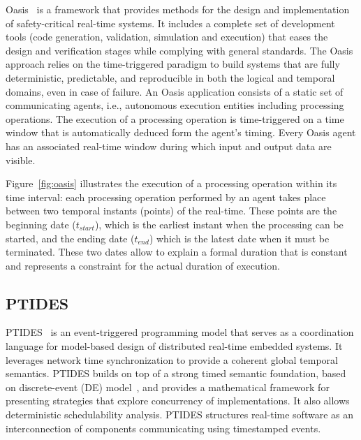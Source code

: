 Oasis~\cite{intro:oasis1,intro:oasis2} is a framework that provides methods for the design 
and implementation of safety-critical real-time systems. It includes a complete set of 
development tools (code generation, validation, simulation and execution) that eases the design 
and verification stages
while complying with general standards. The Oasis approach relies on the time-triggered paradigm
to build systems that are fully deterministic, predictable, and reproducible in both the logical
and temporal domains, even in case of failure.
An Oasis application consists of a static set of communicating agents, i.e., autonomous execution
entities including processing operations. The execution of a processing operation is 
time-triggered on a time window that is automatically deduced form the agent's timing.
Every Oasis agent has an associated real-time window during which input and output data are 
visible.

Figure~\ref{fig:oasis} illustrates the execution of a processing operation within its time
interval: each processing operation performed by an
agent takes place between two temporal instants (points) of the real-time. 
These points are the beginning date ($t_{start}$), which is the earliest instant
when the processing can be started, and the ending date ($t_{end}$) which is the latest
date when it must be terminated. These two dates allow to explain a formal duration 
that is constant and represents a constraint for the actual duration of execution.


\subsection{PTIDES}
PTIDES~\cite{intro:ptides2} is an event-triggered 
programming model that serves as a coordination language for 
model-based design of distributed real-time embedded systems. 
It leverages network time synchronization to provide a coherent global temporal semantics.
PTIDES builds on top of a strong timed semantic foundation, based on discrete-event (DE)
model~\cite{intro:ptides4}, and provides a mathematical framework
for presenting strategies that explore concurrency of implementations. It also allows 
deterministic schedulability analysis.
PTIDES structures real-time software as an interconnection of components communicating using
timestamped events. 

